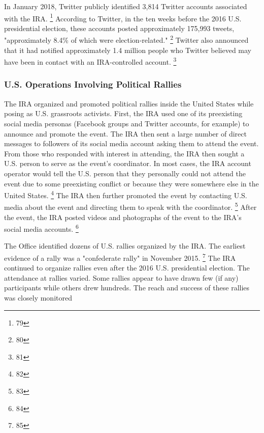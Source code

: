 In January 2018, Twitter publicly identified 3,814 Twitter accounts associated with the IRA.%
\footnote{79}
According to Twitter, in the ten weeks before the 2016 U.S. presidential election, these accounts posted approximately 175,993 tweets, "approximately 8.4\% of which were election-related."%
\footnote{80}
Twitter also announced that it had notified approximately 1.4 million people who Twitter believed may have been in contact with an IRA-controlled account.%
\footnote{81}

\subsubsection{U.S. Operations Involving Political Rallies}

The IRA organized and promoted political rallies inside the United States while posing as U.S. grassroots activists.
First, the IRA used one of its preexisting social media personas (Facebook groups and Twitter accounts, for example) to announce and promote the event.
The IRA then sent a large number of direct messages to followers of its social media account asking them to attend the event.
From those who responded with interest in attending, the IRA then sought a U.S. person to serve as the event's coordinator.
In most cases, the IRA account operator would tell the U.S. person that they personally could not attend the event due to some preexisting conflict or because they were somewhere else in the United States.%
\footnote{82}
The IRA then further promoted the event by contacting U.S. media about the event and directing them to speak with the coordinator.%
\footnote{83}
After the event, the IRA posted videos and photographs of the event to the IRA's  social media accounts.%
\footnote{84}

The Office identified dozens of U.S. rallies organized by the IRA. The earliest evidence of a rally was a "confederate rally" in November 2015.%
\footnote{85}
The IRA continued to organize rallies even after the 2016 U.S. presidential election.
The attendance at rallies varied.
Some rallies appear to have drawn few (if any) participants while others drew hundreds.
The reach and success of these rallies was closely monitored 

